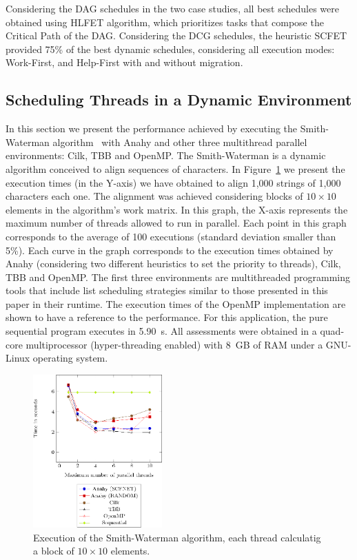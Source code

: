 \documentclass[twocolumn]{svjour3}
\begin{document}
Considering the DAG schedules in the two case studies, all best schedules were obtained using HLFET algorithm, which prioritizes tasks that compose the Critical Path of the DAG. Considering the DCG schedules, the heuristic SCFET provided 75\% of the best dynamic schedules, considering all execution modes: Work-First, and Help-First with and without migration.

\subsection{Scheduling Threads in a Dynamic Environment}

In this section we present the performance achieved by executing the Smith-Waterman algorithm~\cite{smith-waterman} with Anahy and other three multithread parallel environments: Cilk, TBB and OpenMP. The Smith-Waterman is a dynamic algorithm conceived to align sequences of characters. In Figure~\ref{fig:SW} we present the execution times (in the Y-axis) we have obtained to align 1,000 strings of 1,000 characters each one. The alignment was achieved considering blocks of $10 \times 10$ elements in the algorithm's work matrix. In this graph, the X-axis represents the maximum number of threads allowed to run in parallel. Each point in this graph corresponds to the average of 100 executions (standard deviation smaller than 5\%). Each curve in the graph corresponds to the execution times obtained by Anahy (considering two different heuristics to set the priority to threads), Cilk, TBB and OpenMP. The first three environments are multithreaded programming tools that include list scheduling strategies similar to those presented in this paper in their runtime. The execution times of the OpenMP implementation are shown to have a reference to the performance. For this application, the pure sequential program executes in 5.90~s. All assessments were obtained in a quad-core multiprocessor (hyper-threading enabled) with 8~GB of RAM under a GNU-Linux operating system.

\begin{figure}[]
	\centering	
	\includegraphics[width=0.44\textwidth,angle=0]{figs/sw_1000_10.eps}
	\caption{Execution of the Smith-Waterman algorithm, each thread calculatig a block of $10 \times 10$ elements.}
	\label{fig:SW}
\end{figure}
\end{document}

